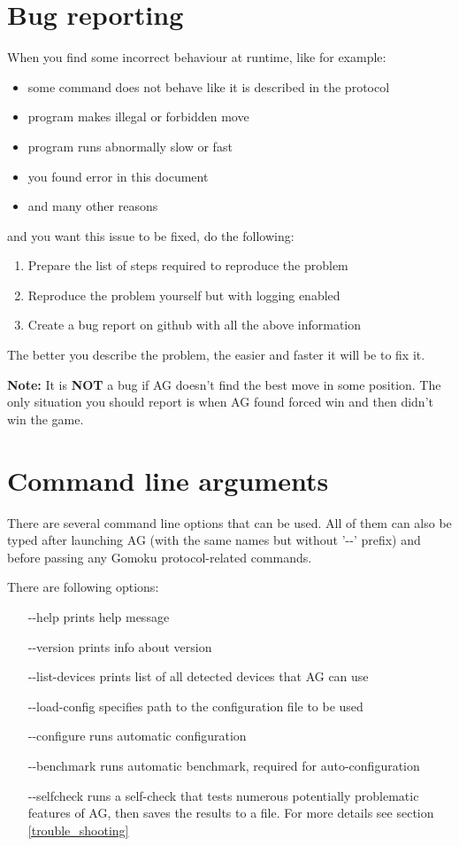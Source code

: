 \documentclass[12pt,a4paper]{article}
\begin{document}
\section{Bug reporting}
\label{bug_reporting}
When you find some incorrect behaviour at runtime, like for example: 
\begin{itemize}
	\item{some command does not behave like it is described in the protocol}
	\item{program makes illegal or forbidden move}
	\item{program runs abnormally slow or fast}
	\item{you found error in this document}
	\item{and many other reasons}
\end{itemize}
and you want this issue to be fixed, do the following:
\begin{enumerate}
	\item{Prepare the list of steps required to reproduce the problem}
	\item{Reproduce the problem yourself but with logging enabled}
	\item{Create a bug report on github with all the above information}
\end{enumerate}
The better you describe the problem, the easier and faster it will be to fix it.


\textbf{Note:} It is \textbf{NOT} a bug if AG doesn't find the best move in some position. The only situation you should report is when AG found forced win and then didn't win the game.


\newpage
\section{Command line arguments}
\label{cmd_options}
There are several command line options that can be used. All of them can also be typed after launching AG (with the same names but without '-{}-' prefix) and before passing any Gomoku protocol-related commands.

There are following options:
\begin{enumerate}[leftmargin=7.5em]
	\item[-{}-help]{prints help message}
	\item[-{}-version]{prints info about version}
	\item[-{}-list-devices]{prints list of all detected devices that AG can use}
	\item[-{}-load-config]{specifies path to the configuration file to be used}
	\item[-{}-configure]{runs automatic configuration}
	\item[-{}-benchmark]{runs automatic benchmark, required for auto-configuration}
	\item[-{}-selfcheck]{runs a self-check that tests numerous potentially problematic features of AG, then saves the results to a file. For more details see section \ref{trouble_shooting}}
\end{enumerate}
\end{document}
